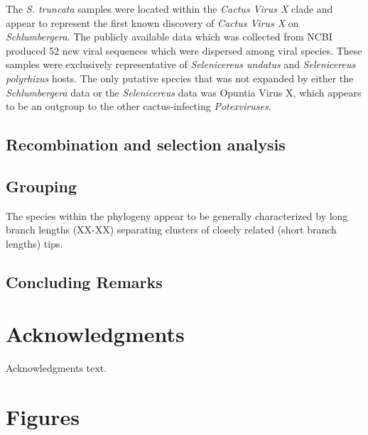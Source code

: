 \documentclass[11pt,letterpaper,titlepage]{article}
\begin{document}
\begin{linenumbers}
The \textit{S. truncata }samples were located within the \textit{Cactus Virus X }clade and appear to represent the first known discovery of \textit{Cactus Virus X} on \textit{Schlumbergera}.
The publicly available data which was collected from NCBI produced 52 new viral sequences which were dispersed among viral species. 
These samples were exclusively representative of \textit{Selenicereus undatus} and \textit{Selenicereus polyrhizus} hosts. 
The only putative species that was not expanded by either the \textit{Schlumbergera} data or the \textit{Selenicereus} data was Opuntia Virus X, which appears to be an outgroup to the other cactus-infecting \textit{Potexviruses}. 

\subsection*{Recombination and selection analysis}
\subsection*{Grouping}
The species within the phylogeny appear to be generally characterized by long branch lengths (XX-XX) separating clusters of closely related (short branch lengths) tips. 

\subsection*{Concluding Remarks}

\section*{Acknowledgments}

Acknowledgments text.

\pagebreak
\raggedright{}
\setlength{\parindent}{0.0in}


\end{linenumbers}
\pagebreak
\frenchspacing
{}
\setlength{\parindent}{0.0in}

\section*{Figures}




\end{document}
